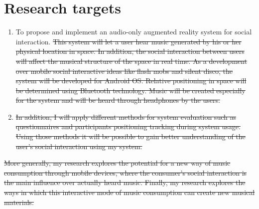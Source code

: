 \section{Research targets}

\begin{enumerate}
	\item To propose and implement an audio-only augmented reality system for social interaction.  \st{This system will let a user hear music generated by his or her physical location in space. In addition, the social interaction between users will affect the musical structure of the space in real time. As a development over mobile social interactive ideas like flash mobs and silent disco, the system will be developed for Android OS. Relative positioning in space will be determined using Bluetooth technology. Music will be created especially for the system and will be heard through headphones by the users.}
	\item {}\st{In addition, I will apply different methods for system evaluation such as questionnaires and participants positioning tracking during system usage. Using those methods it will be possible to gain better understanding of the user's social interaction using my system.}
\end{enumerate}
\st{More generally, my research explores the potential for a new way of music consumption through mobile devices, where the consumer's social interaction is the main influence over actually heard music. Finally, my research explores the ways in which this interactive mode of music consumption can create new musical materials.}